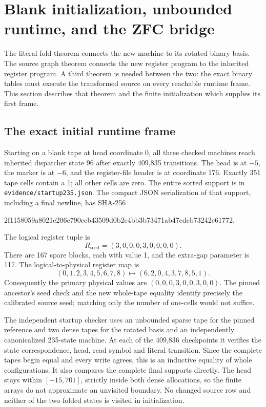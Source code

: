 \section{Blank initialization, unbounded runtime, and the ZFC bridge}
\label{sec:runtime235}

The literal fold theorem connects the new machine to its rotated binary
basis. The source graph theorem connects the new register program to the
inherited register program. A third theorem is needed between the two:
the exact binary tables must execute the transformed source on every
reachable runtime frame. This section describes that theorem and the
finite initialization which supplies its first frame.

\subsection{The exact initial runtime frame}

Starting on a blank tape at head coordinate 0, all three checked machines
reach inherited dispatcher state 96 after exactly 409,835 transitions.
The head is at $-5$, the marker is at $-6$, and the register-file header
is at coordinate 176. Exactly 351 tape cells contain a 1; all other cells
are zero. The entire sorted support is in \texttt{evidence/startup235.json}.
The compact JSON serialization of that support, including a final newline,
has SHA-256
\begin{center}\small\ttfamily
2f1158059a8021e206c790eeb43509d0b2c4bb3b73471ab47edcb73242e61772.
\end{center}

The logical register tuple is
\[
 R_{\mathrm{seed}}=(3,0,0,0,3,0,0,0,0).
\]
There are 167 spare blocks, each with value 1, and the extra-gap parameter
is 117. The logical-to-physical register map is
\[
 (0,1,2,3,4,5,6,7,8)\longmapsto(6,2,0,4,3,7,8,5,1).
\]
Consequently the primary physical values are
$(0,0,0,3,0,0,3,0,0)$. The pinned ancestor's seed check and the new
whole-tape equality identify precisely the calibrated source seed;
matching only the number of one-cells would not suffice.

The independent startup checker uses an unbounded sparse tape for the
pinned reference and two dense tapes for the rotated basis and an
independently canonicalized 235-state machine. At each of the 409,836
checkpoints it verifies the state correspondence, head, read symbol and
literal transition. Since the complete tapes begin equal and every
write agrees, this is an inductive equality of whole configurations.
It also compares the complete final supports directly. The head stays
within $[-15,701]$, strictly inside both dense allocations, so the finite
arrays do not approximate an unvisited boundary. No changed source row
and neither of the two folded states is visited in initialization.

